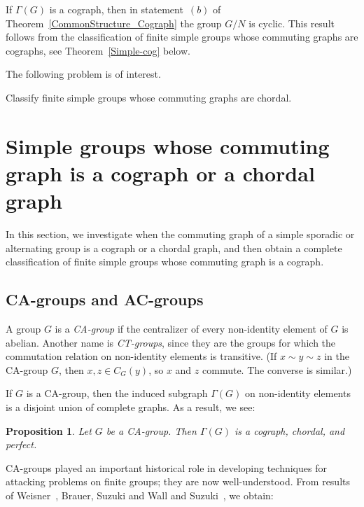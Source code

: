 \documentclass{elsarticle}
\newtheorem{prop}[theorem]{Proposition}
\begin{document}
\begin{remark} If $\Gamma(G)$ is a cograph, then in statement~$(b)$ of Theorem~{\rm \ref{CommonStructure_Cograph}} the group $G/N$ is cyclic. This result follows from the classification of finite simple groups whose commuting graphs are cographs, see Theorem~{\rm \ref{Simple-cog}} below.
\end{remark}


The following problem is of interest.

\begin{problem}\label{Classify} Classify finite simple groups whose commuting graphs are chordal.
\end{problem}


\section{Simple groups whose commuting graph is a cograph or a chordal graph}\label{Simple}

In this section, we investigate when the commuting graph of a simple sporadic or alternating group is a cograph or a chordal graph, and then obtain a complete classification of finite simple groups whose commuting graph is a cograph.

\subsection{CA-groups and AC-groups}

A group $G$ is a \emph{CA-group} if the centralizer of every non-identity
element of $G$ is abelian.
Another name is \emph{CT-groups}, since they are the groups for which
the commutation relation on non-identity elements is transitive. (If
$x\sim y\sim z$ in the CA-group $G$, then $x,z\in C_G(y)$, so $x$ and
$z$ commute. The converse is similar.)

\medskip

If $G$ is a CA-group, then the induced subgraph $\Gamma(G)$ on non-identity
elements is a disjoint union of complete graphs. As a result, we see:

\begin{prop}
Let $G$ be a CA-group. Then $\Gamma(G)$ is a cograph, chordal, and perfect.
\end{prop}

CA-groups played an important historical role in developing techniques for
attacking problems on finite groups; they are now well-understood.
From results of Weisner~\cite{weisner}, Brauer, Suzuki and Wall
\cite{BSW} and Suzuki~\cite{suzuki}, we obtain:
\end{document}
